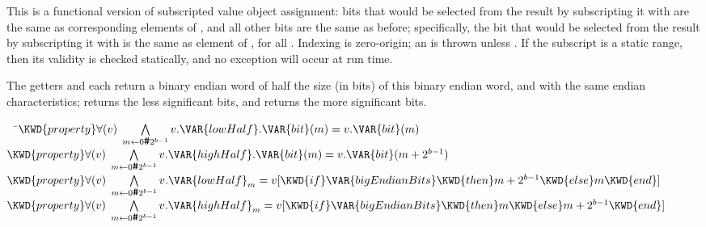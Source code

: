This is a functional version of subscripted value object assignment:
bits that would be selected from the result by subscripting it with 
are the same as corresponding elements of , and all other bits are the same as before;
specifically, the bit that would be selected from the result by subscripting it with
is the same as element  of , for all .
Indexing is zero-origin; an  is thrown unless .
If the subscript is a static range, then its validity is checked statically,
and no exception will occur at run time.



The getters  and  each return a binary endian word of half the size (in bits)
of this binary endian word, and with the same endian characteristics;
 returns the less significant bits, and  returns
the more significant bits.

\begin{Fortress}
{\tt~~}\pushtabs\=\+\(  \KWD{property} \forall(v)\; \bigwedge\limits_{m\leftarrow{}0\mathinner{\hbox{\tt\char'43}}2^{b-1}} v.\VAR{lowHalf}.\VAR{bit}(m) = v.\VAR{bit}(m)\)\\
\(  \KWD{property} \forall(v)\; \bigwedge\limits_{m\leftarrow{}0\mathinner{\hbox{\tt\char'43}}2^{b-1}} v.\VAR{highHalf}.\VAR{bit}(m) = v.\VAR{bit}(m+2^{b-1})\)\\
\(  \KWD{property} \forall(v)\; \bigwedge\limits_{m\leftarrow{}0\mathinner{\hbox{\tt\char'43}}2^{b-1}} v.\VAR{lowHalf}_m = v[\KWD{if} \VAR{bigEndianBits} \KWD{then} m+2^{b-1} \KWD{else} m \KWD{end}]\)\\
\(  \KWD{property} \forall(v)\; \bigwedge\limits_{m\leftarrow{}0\mathinner{\hbox{\tt\char'43}}2^{b-1}} v.\VAR{highHalf}_m = v[\KWD{if} \VAR{bigEndianBits} \KWD{then} m \KWD{else} m+2^{b-1} \KWD{end}]\)\-\\\poptabs
\end{Fortress}


